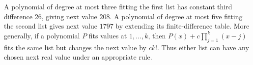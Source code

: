 A polynomial of degree at most three fitting the first list has constant third difference 26, giving next value $208$. A polynomial of degree at most five fitting the second list gives next value $1797$ by extending its finite-difference table. More generally, if a polynomial $P$ fits values at $1,\ldots,k$, then $P(x)+c\prod_{j=1}^k(x-j)$ fits the same list but changes the next value by $ck!$. Thus either list can have any chosen next real value under an appropriate rule.
